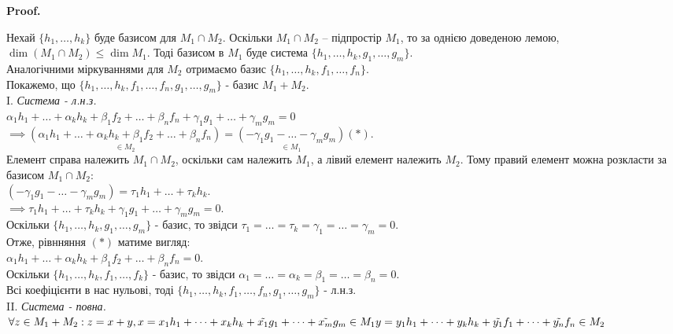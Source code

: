 \documentclass[a4paper, 10pt]{article}
\makeatletter
\theoremstyle{theoremdd}
\renewenvironment{proof}[1][Proof.\\]{\par
\pushQED{\hfill \qed}%
\normalfont \topsep6\p@\@plus6\p@\relax
\trivlist
\item\relax
{\bfseries
#1\@addpunct{.}}\hspace\labelsep\ignorespaces
}{%
\popQED\endtrivlist\@endpefalse
}
\makeatother
\begin{document}
	\begin{proof}
	Нехай $\{h_1, \dots, h_k\}$ буде базисом для $M_1 \cap M_2$. Оскільки $M_1 \cap M_2$ -- підпростір $M_1$, то за однією доведеною лемою, $\dim (M_1 \cap M_2) \leq \dim M_1$. Тоді базисом в $M_1$ буде система $\{h_1, \dots, h_k, g_1, \dots, g_m\}$.\\
	Аналогічними міркуваннями для $M_2$ отримаємо базис $\{h_1, \dots, h_k, f_1, \dots, f_n\}$.\\
	Покажемо, що $\{h_1, \dots, h_k, f_1, \dots, f_n, g_1, \dots, g_m\}$ - базис $M_1 + M_2$.
	\bigskip \\
	I. \textit{Система - л.н.з.}\\
	$\alpha_1 h_1 + \dots + \alpha_k h_k + \beta_1 f_2 + \dots + \beta_n f_n + \gamma_1 g_1 + \dots + \gamma_m g_m = 0$\\
	$\implies \underset{\in M_2}{(\alpha_1 h_1 + \dots + \alpha_k h_k + \beta_1 f_2 + \dots + \beta_n f_n)} = \underset{\in M_1}{(-\gamma_1 g_1 - \dots - \gamma_m g_m)} (*)$.\\
	Елемент справа належить $M_1 \cap M_2$, оскільки сам належить $M_1$, а лівий елемент належить $M_2$. Тому правий елемент можна розкласти за базисом $M_1 \cap M_2$:\\
	$(-\gamma_1 g_1 - \dots - \gamma_m g_m) = \tau_1 h_1 + \dots + \tau_k h_k$.\\
	$\implies \tau_1 h_1 + \dots + \tau_k h_k +\gamma_1 g_1 + \dots + \gamma_m g_m = 0$.\\
	Оскільки $\{h_1, \dots, h_k, g_1, \dots, g_m\}$ - базис, то звідси $\tau_1 = \dots = \tau_k = \gamma_1 = \dots = \gamma_m = 0$.\\
	Отже, рівнняння $(*)$ матиме вигляд:\\
	$\alpha_1 h_1 + \dots + \alpha_k h_k + \beta_1 f_2 + \dots + \beta_n f_n = 0$.\\
	Оскільки $\{h_1, \dots, h_k, f_1, \dots, f_k\}$ - базис, то звідси $\alpha_1 = \dots = \alpha_k = \beta_1 = \dots = \beta_n = 0$.\\
	Всі коефіцієнти в нас нульові, тоді $\{h_1, \dots, h_k, f_1, \dots, f_n, g_1, \dots, g_m\}$ - л.н.з.
	\bigskip \\
	II. \textit{Система - повна.}\\
	$\forall z \in M_1 + M_2: z = x + y, \\x = x_1 h_1 + \dots + x_k h_k + \tilde{x_1}g_1 + \dots + \tilde{x_m}g_m \in M_1 \\ y = y_1 h_1 + \dots + y_k h_k + \tilde{y_1}f_1 + \dots + \tilde{y_n}f_n \in M_2$\\

\end{proof}
\end{document}
